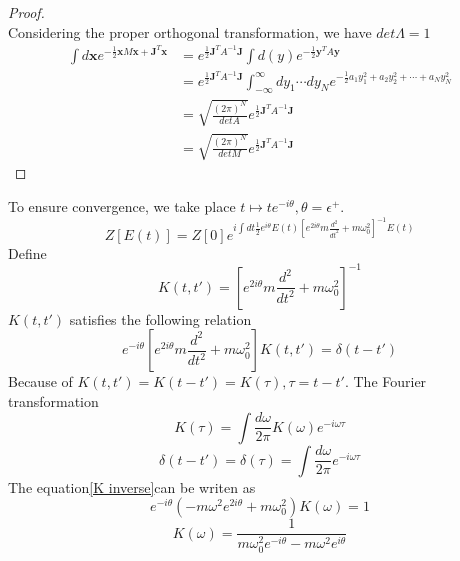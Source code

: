 \documentclass[a4paper,11pt]{article}
\newtheorem{proof}{proof}[section]
\begin{document}
\begin{proof}
\begin{equation*}
  \end{equation*}
  Considering the proper orthogonal transformation, we have $det\Lambda=1$
  \begin{equation*}
    \begin{split}
       \int d\mathbf{x}e^{-\frac{1}{2}\mathbf{x}M\mathbf{x}+\mathbf{J}^T\mathbf{x}}&=e^{\frac{1}{2}\mathbf{J}^TA^{-1}\mathbf{J}}\int d(y)e^{-\frac{1}{2}\mathbf{y}^TA\mathbf{y}}\\
         &=e^{\frac{1}{2}\mathbf{J}^TA^{-1}\mathbf{J}}\int_{-\infty}^{\infty}dy_1\cdots dy_Ne^{-\frac{1}{2}a_1y_1^2+a_2y_2^2+\cdots+a_Ny_N^2}\\
         &=\sqrt{\frac{(2\pi)^N}{detA}}e^{\frac{1}{2}\mathbf{J}^TA^{-1}\mathbf{J}}\\
         &=\sqrt{\frac{(2\pi)^N}{detM}}e^{\frac{1}{2}\mathbf{J}^TA^{-1}\mathbf{J}}
    \end{split}
  \end{equation*}
\end{proof}
To ensure convergence, we take place $t\mapsto te^{-i\theta},\theta=\epsilon^+$.
\begin{equation*}
  Z[E(t)]=Z[0]e^{i\int dt\frac{1}{2}e^{i\theta}E(t)[e^{2i\theta}m\frac{d^2}{dt^2}+m\omega_0^2]^{-1}E(t)}
\end{equation*}
Define
\begin{equation*}
  K(t,t')=[e^{2i\theta}m\frac{d^2}{dt^2}+m\omega_0^2]^{-1}
\end{equation*}
$K(t,t')$ satisfies the following relation
\begin{equation}\label{K inverse}
  e^{-i\theta}[e^{2i\theta}m\frac{d^2}{dt^2}+m\omega_0^2]K(t,t')=\delta(t-t')
\end{equation}
Because of $K(t,t')=K(t-t')=K(\tau),\tau=t-t'$. The Fourier transformation
\begin{equation*}
  K(\tau)=\int \frac{d\omega}{2\pi} K(\omega)e^{-i\omega \tau}
\end{equation*}
\begin{equation*}
  \delta(t-t')=\delta(\tau)=\int \frac{d\omega}{2\pi}e^{-i\omega \tau}
\end{equation*}
The equation\eqref{K inverse}can be writen as
\begin{equation*}
  e^{-i\theta}\left(-m\omega^2e^{2i\theta}+m\omega_0^2\right)K(\omega)=1
\end{equation*}
\begin{equation*}
  K(\omega)=\frac{1}{m\omega_0^2e^{-i\theta}-m\omega^2e^{i\theta}}
\end{equation*}
\end{document}
